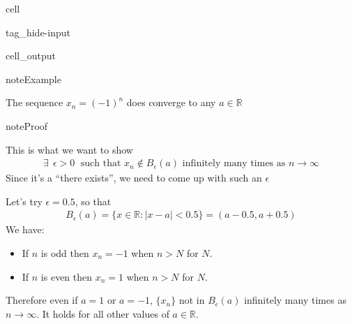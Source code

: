 \documentclass[letterpaper,10pt,english]{jupyterBook}
\begin{document}
\begin{sphinxuseclass}{cell}
\begin{sphinxuseclass}{tag_hide-input}\begin{sphinxVerbatimOutput}

\begin{sphinxuseclass}{cell_output}

\end{sphinxuseclass}\end{sphinxVerbatimOutput}

\end{sphinxuseclass}
\end{sphinxuseclass}
\begin{sphinxadmonition}{note}{Example}

\sphinxAtStartPar
The sequence \(x_n = (-1)^n\) does  converge to any \(a \in \mathbb{R}\)
\end{sphinxadmonition}

\begin{sphinxadmonition}{note}{Proof}

\sphinxAtStartPar
This is what we want to show
\begin{equation*}
\begin{split}
\exists \,\;  \epsilon > 0 \;\text{ such that } x_n \notin B_{\epsilon}(a) \text{ infinitely many times as } n \to \infty
\end{split}
\end{equation*}
\sphinxAtStartPar
Since it’s a “there exists”, we need to come up with such an \(\epsilon\)

\sphinxAtStartPar
Let’s try \(\epsilon = 0.5\), so that
\begin{equation*}
\begin{split}
B_\epsilon(a) = \{ x \in \mathbb{R} : |x - a| < 0.5 \} = (a-0.5, a+0.5 )
\end{split}
\end{equation*}
\sphinxAtStartPar
We have:
\begin{itemize}
\item {} 
\sphinxAtStartPar
If \(n\) is odd then \(x_n = -1\) when \(n > N\) for  \(N\).

\item {} 
\sphinxAtStartPar
If \(n\) is even then \(x_n = 1\) when \(n > N\) for  \(N\).

\end{itemize}

\sphinxAtStartPar
Therefore even if \(a=1\) or \(a=-1\), \(\{x_n\}\) not in \(B_\epsilon(a)\) infinitely many times as \(n \to \infty\). It holds for all other values of \(a \in \mathbb{R}\).
\end{sphinxadmonition}
\end{document}
